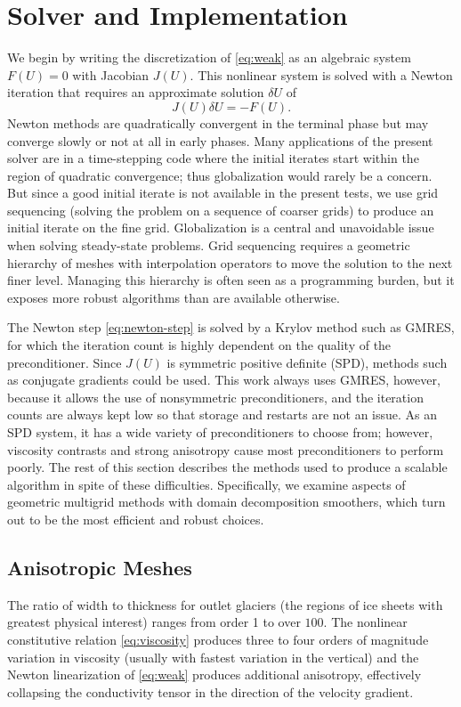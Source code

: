 \section{Solver and Implementation}\label{sec:solver}
We begin by writing the discretization of \eqref{eq:weak} as an algebraic system $F(U) = 0$ with
Jacobian $J(U)$.  This nonlinear system is solved with a Newton iteration that requires an
approximate solution $\delta U$ of
\begin{equation}\label{eq:newton-step}
  J(U)\delta U = -F(U) .
\end{equation}
Newton methods are quadratically convergent in the terminal phase but may converge slowly or
not at all in early phases.  Many applications of the present solver are in a time-stepping code
where the initial iterates start within the region of quadratic convergence; thus globalization
would rarely be a concern. But since a good initial iterate is not available in the present tests,
we use grid sequencing (solving the problem on a sequence of coarser grids) to produce an initial
iterate on the fine grid.
Globalization is a central and unavoidable issue when solving steady-state problems.
Grid sequencing requires a geometric hierarchy of meshes with interpolation operators to move the solution to the next finer level.
Managing this hierarchy is often seen as a programming burden, but it exposes more robust algorithms than are available otherwise.

The Newton step \eqref{eq:newton-step} is solved by a Krylov method such as GMRES, for which the iteration count is highly dependent on the quality of the preconditioner.  Since $J(U)$ is symmetric positive definite (SPD), methods such as conjugate gradients could be used. This work always uses GMRES, however, because it allows the use of nonsymmetric preconditioners, and the iteration counts are always kept low so that storage and restarts are not an issue.  As an SPD system, it has a wide variety of preconditioners to choose from; however, viscosity contrasts and strong anisotropy cause most preconditioners to perform poorly.  The rest of this section describes the methods used to produce a scalable algorithm in spite of these difficulties.
Specifically, we examine aspects of geometric multigrid methods with domain decomposition smoothers, which turn out to be the most efficient and robust choices.

\subsection{Anisotropic Meshes}\label{sec:anisotropic-meshes}
The ratio of width to thickness for outlet glaciers (the regions of ice sheets with greatest physical interest) ranges from order 1 to over $100$.  The nonlinear constitutive relation \eqref{eq:viscosity} produces three to four orders of magnitude variation in viscosity (usually with fastest variation in the vertical) and the Newton linearization of \eqref{eq:weak} produces additional anisotropy, effectively collapsing the conductivity tensor in the direction of the velocity gradient.


